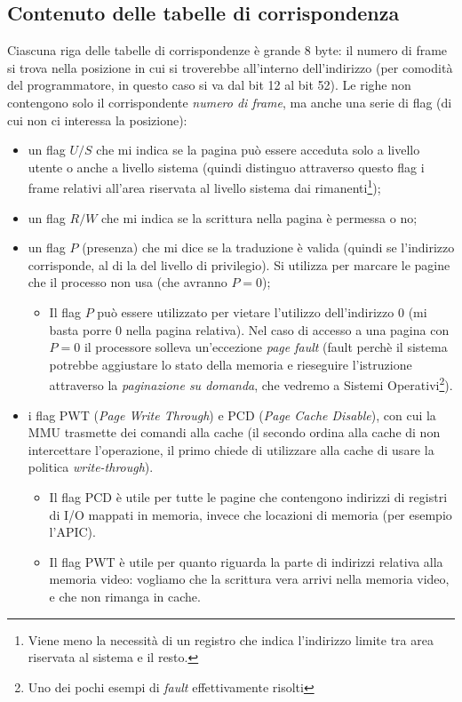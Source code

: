 \documentclass[11pt]{report}
\theoremstyle{definition}
\begin{document}
\subsection{Contenuto delle tabelle di corrispondenza} Ciascuna riga delle tabelle di corrispondenze è grande 8 byte: il numero di frame si trova nella posizione in cui si troverebbe all'interno dell'indirizzo (per comodità del programmatore, in questo caso si va dal bit 12 al bit 52). Le righe non contengono solo il corrispondente \emph{numero di frame}, ma anche una serie di flag (di cui non ci interessa la posizione):
 \begin{itemize}
 	\item un flag $U/S$ che mi indica se la pagina può essere acceduta solo a livello utente o anche a livello sistema (quindi distinguo attraverso questo flag i frame relativi all'area riservata al livello sistema dai rimanenti\footnote{Viene meno la necessità di un registro che indica l'indirizzo limite tra area riservata al sistema e il resto.});
 	\item un flag $R/W$ che mi indica se la scrittura nella pagina è permessa o no;
 	\item un flag $P$ (presenza) che mi dice se la traduzione è valida (quindi se l'indirizzo corrisponde, al di la del livello di privilegio). Si utilizza per marcare le pagine che il processo non usa (che avranno $P=0$);
 	\begin{itemize}
 		\item Il flag $P$ può essere utilizzato per vietare l'utilizzo dell'indirizzo $0$ (mi basta porre $0$ nella pagina relativa). Nel caso di accesso a una pagina con $P=0$ il processore solleva un'eccezione \emph{page fault} (fault perchè il sistema potrebbe aggiustare lo stato della memoria e rieseguire l'istruzione attraverso la \emph{paginazione su domanda}, che vedremo a Sistemi Operativi\footnote{Uno dei pochi esempi di \emph{fault} effettivamente risolti}).
 	\end{itemize}
 	\item i flag PWT (\emph{Page Write Through}) e PCD (\emph{Page Cache Disable}), con cui la MMU trasmette dei comandi alla cache (il secondo ordina alla cache di non intercettare l'operazione, il primo chiede di utilizzare alla cache di usare la politica \emph{write-through}).
 	\begin{itemize}
 		\item Il flag PCD è utile per tutte le pagine che contengono indirizzi di registri di I/O mappati in memoria, invece che locazioni di memoria (per esempio l'APIC). 
 		\item Il flag PWT è utile per quanto riguarda la parte di indirizzi relativa alla memoria video: vogliamo che la scrittura vera arrivi nella memoria video, e che non rimanga in cache.
 	\end{itemize}
 \end{itemize}
\end{document}
